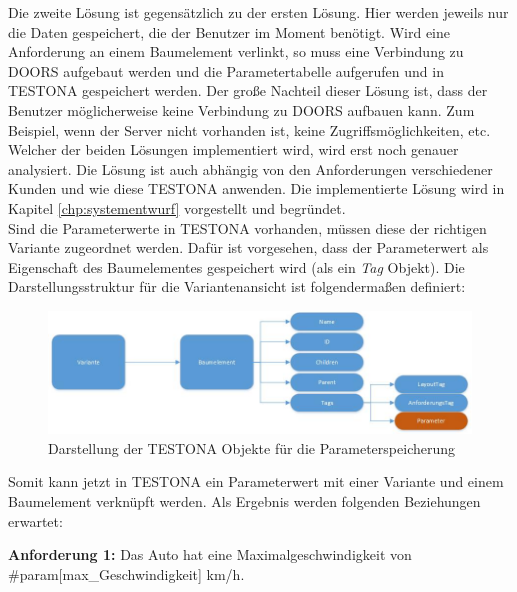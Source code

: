 Die zweite Lösung ist gegensätzlich zu der ersten Lösung. Hier werden jeweils nur die Daten gespeichert, die der Benutzer im Moment benötigt. Wird eine Anforderung an einem Baumelement verlinkt, so muss eine Verbindung zu DOORS aufgebaut werden und die Parametertabelle aufgerufen und in TESTONA gespeichert werden. Der große Nachteil dieser Lösung ist, dass der Benutzer möglicherweise keine Verbindung zu DOORS aufbauen kann. Zum Beispiel, wenn der Server nicht vorhanden ist, keine Zugriffsmöglichkeiten, etc. Welcher der beiden Lösungen implementiert wird, wird erst noch genauer analysiert. Die Lösung ist auch abhängig von den Anforderungen verschiedener Kunden und wie diese TESTONA anwenden. Die implementierte Lösung wird in Kapitel \ref{chp:systementwurf} vorgestellt und begründet.\\


Sind die Parameterwerte in TESTONA vorhanden, müssen diese der richtigen Variante zugeordnet werden. Dafür ist vorgesehen, dass der Parameterwert als Eigenschaft des Baumelementes gespeichert wird (als ein \textit{Tag} Objekt). Die Darstellungsstruktur für die Variantenansicht ist folgendermaßen definiert:\\

\begin{figure}[h!]
  \begin{center}
    \includegraphics[scale=0.65]{4_1_UML_Var_TreeItem_Properties.jpg}
  		  \caption{Darstellung der TESTONA Objekte für die Parameterspeicherung}
     \label{ttn.objectGraph}
  \end{center}
\end{figure}

\hspace{2cm}

Somit kann jetzt in TESTONA ein Parameterwert mit einer Variante und einem Baumelement verknüpft werden. Als Ergebnis werden folgenden Beziehungen erwartet:

\begin{center}
\textbf{Anforderung 1: }Das Auto hat eine Maximalgeschwindigkeit von \#param[max\_Geschwindigkeit] km/h.
\end{center}

